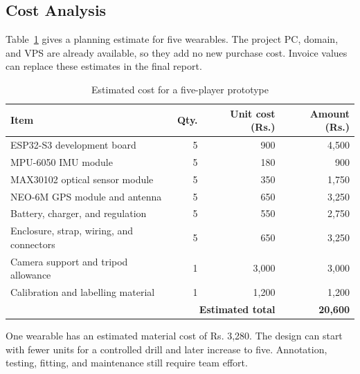 \subsection{Cost Analysis}
Table~\ref{tab:cost_analysis} gives a planning estimate for five wearables. The
project PC, domain, and VPS are already available, so they add no new purchase
cost. Invoice values can replace these estimates in the final report.

\begin{table}[H]
\centering
\caption{Estimated cost for a five-player prototype}
\label{tab:cost_analysis}
\small
\begin{tabularx}{\textwidth}{X r r r}
\toprule
\textbf{Item} & \textbf{Qty.} & \textbf{Unit cost (Rs.)} & \textbf{Amount (Rs.)}\\
\midrule
ESP32-S3 development board & 5 & 900 & 4,500\\
MPU-6050 IMU module & 5 & 180 & 900\\
MAX30102 optical sensor module & 5 & 350 & 1,750\\
NEO-6M GPS module and antenna & 5 & 650 & 3,250\\
Battery, charger, and regulation & 5 & 550 & 2,750\\
Enclosure, strap, wiring, and connectors & 5 & 650 & 3,250\\
Camera support and tripod allowance & 1 & 3,000 & 3,000\\
Calibration and labelling material & 1 & 1,200 & 1,200\\
\midrule
\multicolumn{3}{r}{\textbf{Estimated total}} & \textbf{20,600}\\
\bottomrule
\end{tabularx}
\end{table}

One wearable has an estimated material cost of Rs. 3,280. The design can start
with fewer units for a controlled drill and later increase to five. Annotation,
testing, fitting, and maintenance still require team effort.

